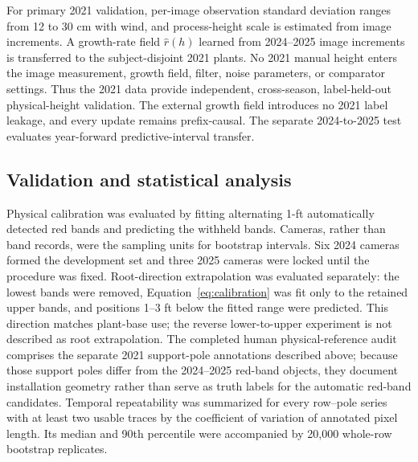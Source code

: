 \documentclass[12pt,letterpaper]{article}
\begin{document}
For primary 2021 validation, per-image observation standard deviation ranges from 12 to 30 cm with wind, and process-height scale is estimated from image increments. A growth-rate field $\hat r(h)$ learned from 2024--2025 image increments is transferred to the subject-disjoint 2021 plants. No 2021 manual height enters the image measurement, growth field, filter, noise parameters, or comparator settings. Thus the 2021 data provide independent, cross-season, label-held-out physical-height validation. The external growth field introduces no 2021 label leakage, and every update remains prefix-causal. The separate 2024-to-2025 test evaluates year-forward predictive-interval transfer.

\subsection{Validation and statistical analysis}

Physical calibration was evaluated by fitting alternating 1-ft automatically detected red bands and predicting the withheld bands. Cameras, rather than band records, were the sampling units for bootstrap intervals. Six 2024 cameras formed the development set and three 2025 cameras were locked until the procedure was fixed. Root-direction extrapolation was evaluated separately: the lowest bands were removed, Equation~\ref{eq:calibration} was fit only to the retained upper bands, and positions 1--3 ft below the fitted range were predicted. This direction matches plant-base use; the reverse lower-to-upper experiment is not described as root extrapolation. The completed human physical-reference audit comprises the separate 2021 support-pole annotations described above; because those support poles differ from the 2024--2025 red-band objects, they document installation geometry rather than serve as truth labels for the automatic red-band candidates. Temporal repeatability was summarized for every row--pole series with at least two usable traces by the coefficient of variation of annotated pixel length. Its median and 90th percentile were accompanied by 20,000 whole-row bootstrap replicates.
\end{document}
